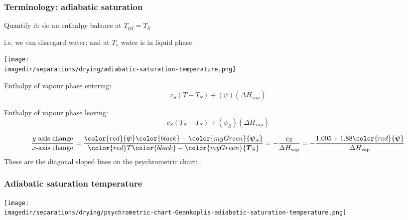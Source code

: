 \begin{frame}\frametitle{Terminology: adiabatic saturation}
	Quantify it: do an enthalpy balance at $T_\text{ref} = T_S$

	{ i.e. we can disregard water; and at $T_s$ water is in liquid phase}
	\begin{center}
		\texttt{[image: \\imagedir/separations/drying/adiabatic-saturation-temperature.png]}
	\end{center}
	\vspace{-12pt}
	\begin{exampleblock}{Enthalpy of vapour phase entering:}
		\[c_S\left(T - T_S \right) + (\psi) (\Delta H_\text{vap})\]
	\end{exampleblock}
	\begin{exampleblock}{Enthalpy of vapour phase leaving:}
		\[c_S\left(T_S - T_S \right) + (\psi_S) (\Delta H_\text{vap})\]
	\end{exampleblock}

	\vspace{-12pt}
	\[
		\displaystyle \frac{y\text{-axis change}}{x\text{-axis change}} = \frac{\color{red}{\boldsymbol \psi} \color{black} - \color{myGreen}{\boldsymbol \psi_S}}{\color{red}T \color{black}- \color{myGreen}{\boldsymbol T_S}} = - \frac{c_S}{\Delta H_\text{vap}} = - \frac{1.005 + 1.88 \color{red}{\boldsymbol \psi}}{\Delta H_\text{vap}}
	\]
	These are the diagonal sloped lines on the psychrometric chart: {\color{purple}{adiabatic saturation curves}}.
\end{frame}

\begin{frame}\frametitle{Adiabatic saturation temperature}
	\vfill
	\begin{center}
		\texttt{[image: \\imagedir/separations/drying/psychrometric-chart-Geankoplis-adiabatic-saturation-temperature.png]}
	\end{center}
\end{frame}

